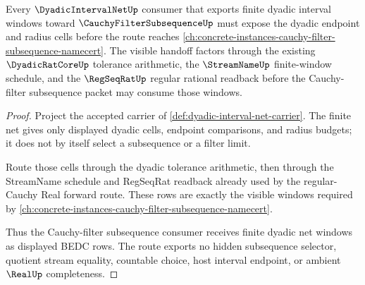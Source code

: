 \begin{theorem}
\label{thm:dyadic-interval-net-cauchy-filter-subsequence-route}
Every $\DyadicIntervalNetUp$ consumer that exports finite dyadic interval windows toward $\CauchyFilterSubsequenceUp$ must expose the dyadic endpoint and radius cells before the route reaches \autoref{ch:concrete-instances-cauchy-filter-subsequence-namecert}. The visible handoff factors through the existing $\DyadicRatCoreUp$ tolerance arithmetic, the $\StreamNameUp$ finite-window schedule, and the $\RegSeqRatUp$ regular rational readback before the Cauchy-filter subsequence packet may consume those windows.
\end{theorem}
\begin{proof}
Project the accepted carrier of \autoref{def:dyadic-interval-net-carrier}. The finite net gives only displayed dyadic cells, endpoint comparisons, and radius budgets; it does not by itself select a subsequence or a filter limit.

Route those cells through the dyadic tolerance arithmetic, then through the StreamName schedule and RegSeqRat readback already used by the regular-Cauchy Real forward route. These rows are exactly the visible windows required by \autoref{ch:concrete-instances-cauchy-filter-subsequence-namecert}.

Thus the Cauchy-filter subsequence consumer receives finite dyadic net windows as displayed BEDC rows. The route exports no hidden subsequence selector, quotient stream equality, countable choice, host interval endpoint, or ambient $\RealUp$ completeness.
\end{proof}
